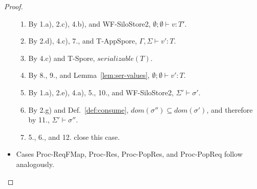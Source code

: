 \documentclass{article}
\theoremstyle{definition}
\begin{document}
\begin{proof}
\begin{itemize}
\begin{enumerate}
\item By 1.a), 2.c), 4.b), and WF-SiloStore2, $\emptyset ; \emptyset \vdash v : T'$.
\item By 2.d), 4.c), 7., and T-AppSpore, $\Gamma, \Sigma \vdash v' : T$.
\item By 4.c) and T-Spore, $serializable(T)$.
\item By 8., 9., and Lemma~\ref{lem:ser-values}, $\emptyset ; \emptyset \vdash v' : T$.
\item By 1.a), 2.e), 4.a), 5., 10., and WF-SiloStore2, $\Sigma' \vdash \sigma'$.
\item By 2.g) and Def.~\ref{def:consume}, $dom(\sigma'') \subseteq dom(\sigma')$, and therefore by 11., $\Sigma' \vdash \sigma''$.
\item 5., 6., and 12. close this case.
\end{enumerate}

\item Cases Proc-ReqFMap, Proc-Res, Proc-PopRes, and Proc-PopReq follow analogously.

\end{itemize}
\end{proof}
\end{document}
